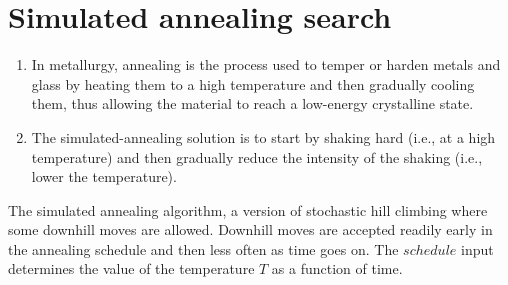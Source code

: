 \section{Simulated annealing search \cite{ai/book/Artificial-Intelligence-A-Modern-Approach/Russell-Norvig}}
\label{AI: Algorithms/Simulated annealing search}


\begin{enumerate}
    \item In metallurgy, annealing is the process used to temper or harden metals and glass by heating them to a high temperature and then gradually cooling them, thus allowing the material to reach a low-energy crystalline state.
    \hfill \cite{ai/book/Artificial-Intelligence-A-Modern-Approach/Russell-Norvig}

    \item The simulated-annealing solution is to start by shaking hard (i.e., at a high temperature) and then gradually reduce the intensity of the shaking (i.e., lower the temperature).
    \hfill \cite{ai/book/Artificial-Intelligence-A-Modern-Approach/Russell-Norvig}
\end{enumerate}


\vspace{0.5cm}

\begin{algorithm}[H]
    \caption{
        The simulated annealing algorithm, a version of stochastic hill climbing where some downhill moves are allowed. 
        Downhill moves are accepted readily early in the annealing schedule and then less often as time goes on. 
        The $schedule$ input determines the value of the temperature $T$ as a function of time. 
        \cite{ai/book/Artificial-Intelligence-A-Modern-Approach/Russell-Norvig}
    }


\end{algorithm}


